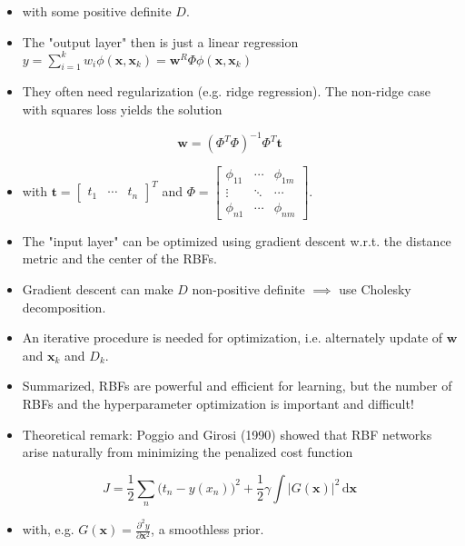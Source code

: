 \documentclass[a4paper, 11pt, accentcolor = tud3b]{tudreport}
\newcommand{\dif}[1]{\ensuremath{\,\mathrm{d}#1}}
\renewcommand{\vec}[1]{\mathbf{#1}}
\begin{document}
			\begin{itemize}
				\item[] with some positive definite \(D\).
				\item The "output layer" then is just a linear regression \( y = \sum_{i = 1}^{k} w_i \phi(\vec{x}, \vec{x}_k) = \vec{w}^R \Phi\phi(\vec{x}, \vec{x}_k) \)
				\item They often need regularization (e.g. ridge regression). The non-ridge case with squares loss yields the solution
			\end{itemize}
			\begin{equation}
				\vec{w} = (\Phi^T \Phi)^{-1} \Phi^T \vec{t}
			\end{equation}
			\begin{itemize}
				\item[] with \( \vec{t} = \begin{bmatrix} t_1 & \cdots & t_n \end{bmatrix}^T \) and \( \Phi = \begin{bmatrix}
					\phi_{11} & \cdots & \phi_{1m} \\
					\vdots & \ddots & \cdots \\
					\phi_{n1} & \cdots & \phi_{nm}
					\end{bmatrix} \).
				\item The "input layer" can be optimized using gradient descent w.r.t. the distance metric and the center of the RBFs.
				\item Gradient descent can make \(D\) non-positive definite \(\implies\) use Cholesky decomposition.
				\item An iterative procedure is needed for optimization, i.e. alternately update of \(\vec{w}\) and \(\vec{x}_k\) and \(D_k\).
				\item Summarized, RBFs are powerful and efficient for learning, but the number of RBFs and the hyperparameter optimization is important and difficult!
				\item Theoretical remark: Poggio and Girosi (1990) showed that RBF networks arise naturally from minimizing the penalized cost function
			\end{itemize}
			\begin{equation}
				J = \frac{1}{2} \sum_n \big(t_n - y(x_n)\big)^2 + \frac{1}{2} \gamma \int \big\lvert G(\vec{x}) \big\rvert^2 \dif{\vec{x}}
			\end{equation}
			\begin{itemize}
				\item[] with, e.g. \( G(\vec{x}) = \frac{\partial^2 y}{\partial \vec{x}^2} \), a smoothless prior.
			\end{itemize}
		
\end{document}
